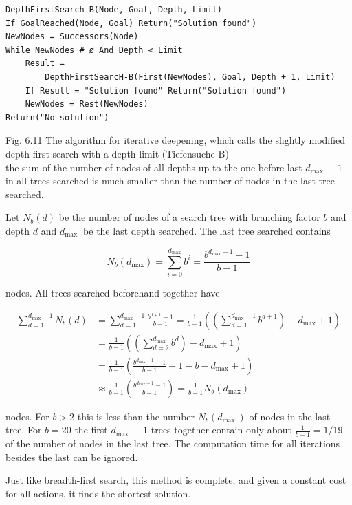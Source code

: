 \documentclass[10pt]{article}
\begin{document}
\begin{verbatim}
DepthFirstSearch-B(Node, Goal, Depth, Limit)
If GoalReached(Node, Goal) Return("Solution found")
NewNodes = Successors(Node)
While NewNodes # ø And Depth < Limit
    Result =
        DepthFirstSearcH-B(First(NewNodes), Goal, Depth + 1, Limit)
    If Result = "Solution found" Return("Solution found")
    NewNodes = Rest(NewNodes)
Return("No solution")
\end{verbatim}

Fig. 6.11 The algorithm for iterative deepening, which calls the slightly modified depth-first search with a depth limit (Tiefensuche-B)\\
the sum of the number of nodes of all depths up to the one before last $d_{\text {max }}-1$ in all trees searched is much smaller than the number of nodes in the last tree searched.

Let $N_{b}(d)$ be the number of nodes of a search tree with branching factor $b$ and depth $d$ and $d_{\text {max }}$ be the last depth searched. The last tree searched contains

$$
N_{b}\left(d_{\max }\right)=\sum_{i=0}^{d_{\max }} b^{i}=\frac{b^{d_{\max }+1}-1}{b-1}
$$

nodes. All trees searched beforehand together have

$$
\begin{aligned}
\sum_{d=1}^{d_{\max }-1} N_{b}(d) & =\sum_{d=1}^{d_{\max }-1} \frac{b^{d+1}-1}{b-1}=\frac{1}{b-1}\left(\left(\sum_{d=1}^{d_{\max }-1} b^{d+1}\right)-d_{\max }+1\right) \\
& =\frac{1}{b-1}\left(\left(\sum_{d=2}^{d_{\max }} b^{d}\right)-d_{\max }+1\right) \\
& =\frac{1}{b-1}\left(\frac{b^{d_{\max }+1}-1}{b-1}-1-b-d_{\max }+1\right) \\
& \approx \frac{1}{b-1}\left(\frac{b^{d_{\max }+1}-1}{b-1}\right)=\frac{1}{b-1} N_{b}\left(d_{\max }\right)
\end{aligned}
$$

nodes. For $b>2$ this is less than the number $N_{b}\left(d_{\text {max }}\right)$ of nodes in the last tree. For $b=20$ the first $d_{\text {max }}-1$ trees together contain only about $\frac{1}{b-1}=1 / 19$ of the number of nodes in the last tree. The computation time for all iterations besides the last can be ignored.

Just like breadth-first search, this method is complete, and given a constant cost for all actions, it finds the shortest solution.
\end{document}
